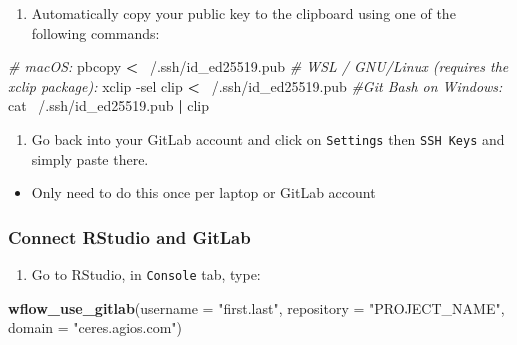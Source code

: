 \documentclass[openany]{book}
\newenvironment{Shaded}{\begin{snugshade}}{\end{snugshade}}
\newcommand{\CommentTok}[1]{\textcolor[rgb]{0.56,0.35,0.01}{\textit{#1}}}
\newcommand{\DataTypeTok}[1]{\textcolor[rgb]{0.13,0.29,0.53}{#1}}
\newcommand{\ExtensionTok}[1]{#1}
\newcommand{\FunctionTok}[1]{\textcolor[rgb]{0.00,0.00,0.00}{#1}}
\newcommand{\KeywordTok}[1]{\textcolor[rgb]{0.13,0.29,0.53}{\textbf{#1}}}
\newcommand{\NormalTok}[1]{#1}
\newcommand{\OperatorTok}[1]{\textcolor[rgb]{0.81,0.36,0.00}{\textbf{#1}}}
\newcommand{\StringTok}[1]{\textcolor[rgb]{0.31,0.60,0.02}{#1}}
\providecommand{\tightlist}{%
  \setlength{\itemsep}{0pt}\setlength{\parskip}{0pt}}
\begin{document}
\begin{enumerate}
\def\labelenumi{\arabic{enumi}.}
\tightlist
\item
  Automatically copy your public key to the clipboard using one of the following commands:
\end{enumerate}

\begin{Shaded}
\begin{Highlighting}[]
\CommentTok{# macOS:}
\ExtensionTok{pbcopy} \OperatorTok{<}\NormalTok{ ~/.ssh/id_ed25519.pub}
\CommentTok{# WSL / GNU/Linux (requires the xclip package):}
\ExtensionTok{xclip}\NormalTok{ -sel clip }\OperatorTok{<}\NormalTok{ ~/.ssh/id_ed25519.pub}
\CommentTok{#Git Bash on Windows:}
\FunctionTok{cat}\NormalTok{ ~/.ssh/id_ed25519.pub }\KeywordTok{|} \ExtensionTok{clip}
\end{Highlighting}
\end{Shaded}

\begin{enumerate}
\def\labelenumi{\arabic{enumi}.}
\setcounter{enumi}{1}
\tightlist
\item
  Go back into your GitLab account and click on \texttt{Settings} then \texttt{SSH\ Keys} and simply paste there.
\end{enumerate}

\begin{itemize}
\tightlist
\item
  Only need to do this once per laptop or GitLab account
\end{itemize}

\hypertarget{connect-rstudio-and-gitlab}{%
\subsubsection{Connect RStudio and GitLab}\label{connect-rstudio-and-gitlab}}

\begin{enumerate}
\def\labelenumi{\arabic{enumi}.}
\tightlist
\item
  Go to RStudio, in \texttt{Console} tab, type:
\end{enumerate}

\begin{Shaded}
\begin{Highlighting}[]
 \KeywordTok{wflow_use_gitlab}\NormalTok{(}\DataTypeTok{username =} \StringTok{"first.last"}\NormalTok{, }\DataTypeTok{repository =} \StringTok{"PROJECT_NAME"}\NormalTok{, }\DataTypeTok{domain =} \StringTok{"ceres.agios.com"}\NormalTok{)}
\end{Highlighting}
\end{Shaded}
\end{document}
